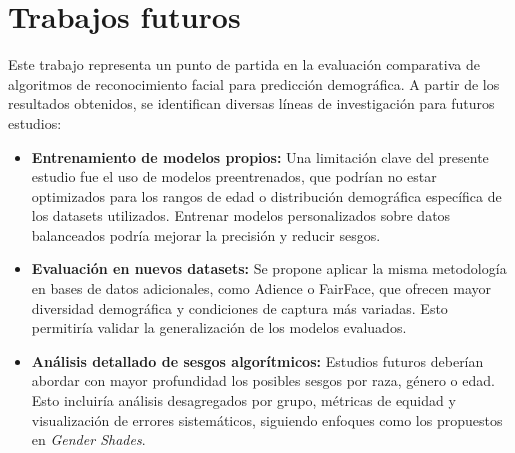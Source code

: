 \section{Trabajos futuros}

Este trabajo representa un punto de partida en la evaluación comparativa de algoritmos de reconocimiento facial para predicción demográfica. A partir de los resultados obtenidos, se identifican diversas líneas de investigación para futuros estudios:
\begin{itemize}
  \item \textbf{Entrenamiento de modelos propios:} Una limitación clave del presente estudio fue el uso de modelos preentrenados, que podrían no estar optimizados para los rangos de edad o distribución demográfica específica de los datasets utilizados. Entrenar modelos personalizados sobre datos balanceados podría mejorar la precisión y reducir sesgos.
  \item \textbf{Evaluación en nuevos datasets:} Se propone aplicar la misma metodología en bases de datos adicionales, como Adience o FairFace, que ofrecen mayor diversidad demográfica y condiciones de captura más variadas. Esto permitiría validar la generalización de los modelos evaluados.
  \item \textbf{Análisis detallado de sesgos algorítmicos:} Estudios futuros deberían abordar con mayor profundidad los posibles sesgos por raza, género o edad. Esto incluiría análisis desagregados por grupo, métricas de equidad y visualización de errores sistemáticos, siguiendo enfoques como los propuestos en \textit{Gender Shades}.
\end{itemize}